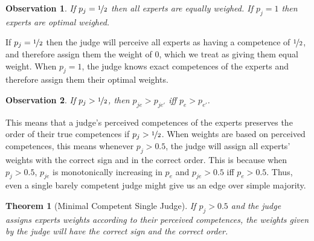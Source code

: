 \documentclass[letterpaper]{article} %
\newtheorem{observation}{Observation}
\newtheorem{theorem}{Theorem}
\newcommand{\judge}{\ensuremath{j} }
\newcommand{\expert}{\ensuremath{e} }
\begin{document}
\begin{observation}\label{observation:extremes}
 If $p_\judge = \nicefrac{1}{2}$ then all experts are equally weighed. %
 If $p_\judge = 1$ then experts are optimal weighed.
 \end{observation}
 
If $p_\judge = \nicefrac{1}{2}$ then the judge will perceive all experts as having a competence of $\nicefrac{1}{2}$, and therefore assign them the weight of 0, which we treat as giving them equal weight. %
When $p_\judge = 1$, the judge knows exact competences of the experts and therefore assign them their optimal weights.
 
\begin{observation}\label{observation:monotonic}
 If $p_\judge > \nicefrac{1}{2}$, then $p_{\judge \expert} > p_{\judge \expert'}$ iff $p_\expert > p_{\expert'}$.
\end{observation}
 
This means that a judge's perceived competences of the experts preserves the order of their true competences if $p_j > \nicefrac{1}{2}$. 
%
When weights are based on perceived competences, this means whenever $p_\judge > 0.5$, the judge will assign all experts' weights with the correct sign and in the correct order. This is because when $p_\judge > 0.5$, $p_{\judge \expert}$ is monotonically increasing in $p_\expert$ and $p_{\judge \expert} > 0.5$ iff $p_\expert > 0.5$. Thus, even a single barely competent judge might give us an edge over simple majority.


\begin{theorem}[Minimal Competent Single Judge]\label{thm:minimal_comp}
 If $p_j > 0.5$ and the judge assigns experts weights according to their perceived competences, the weights given by the judge will have the correct sign and the correct order.
\end{theorem}
\end{document}
